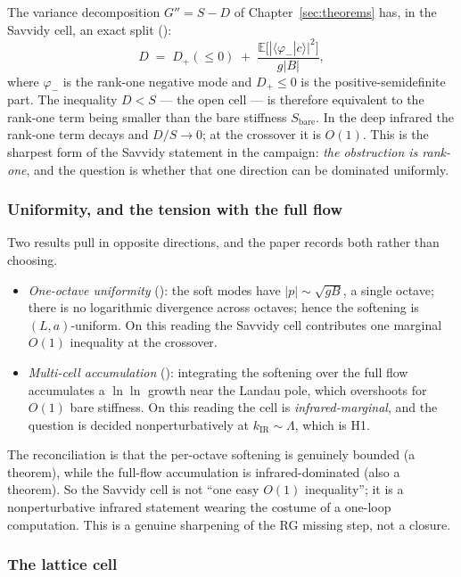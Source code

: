 The variance decomposition $G''=S-D$ of Chapter~\ref{sec:theorems} has, in the Savvidy cell, an
exact split ():
\begin{equation}
D\;=\;D_+(\le0)\;+\;\frac{\mathbb E\bigl[|\langle\varphi_-|c\rangle|^2\bigr]}{g|B|},
\label{eq:dsplit}
\end{equation}
where $\varphi_-$ is the rank-one negative mode and $D_+\le0$ is the positive-semidefinite part.
The inequality $D<S$ --- the open cell --- is therefore equivalent to the rank-one term being
smaller than the bare stiffness $S_{\mathrm{bare}}$. In the deep infrared the rank-one term
decays and $D/S\to0$; at the crossover it is $O(1)$. This is the sharpest form of the Savvidy
statement in the campaign: \emph{the obstruction is rank-one}, and the question is whether that
one direction can be dominated uniformly.

\subsubsection{Uniformity, and the tension with the full flow}

Two results pull in opposite directions, and the paper records both rather than choosing.
\begin{itemize}
\item \emph{One-octave uniformity} (): the soft modes have
  $|p|\sim\sqrt{gB}$, a single octave; there is no logarithmic divergence across octaves; hence
  the softening is $(L,a)$-uniform. On this reading the Savvidy cell contributes one marginal
  $O(1)$ inequality at the crossover.
\item \emph{Multi-cell accumulation} (): integrating the softening
  over the full flow accumulates a $\ln\ln$ growth near the Landau pole, which overshoots for
  $O(1)$ bare stiffness. On this reading the cell is \emph{infrared-marginal}, and the question
  is decided nonperturbatively at $k_{\mathrm{IR}}\sim\Lambda$, which is H1.
\end{itemize}
The reconciliation is that the per-octave softening is genuinely bounded (a theorem), while the
full-flow accumulation is infrared-dominated (also a theorem). So the Savvidy cell is not ``one
easy $O(1)$ inequality''; it is a nonperturbative infrared statement wearing the costume of a
one-loop computation. This is a genuine sharpening of the RG missing step, not a closure.

\subsubsection{The lattice cell}

